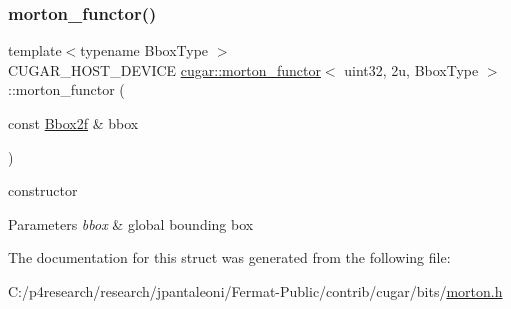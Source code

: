 \subsubsection{\texorpdfstring{morton\+\_\+functor()}{morton\_functor()}}
{\footnotesize\ttfamily template$<$typename Bbox\+Type $>$ \\
C\+U\+G\+A\+R\+\_\+\+H\+O\+S\+T\+\_\+\+D\+E\+V\+I\+CE \hyperlink{structcugar_1_1morton__functor}{cugar\+::morton\+\_\+functor}$<$ uint32, 2u, Bbox\+Type $>$\+::morton\+\_\+functor (\begin{DoxyParamCaption}\item[{const \hyperlink{structcugar_1_1_bbox}{Bbox2f} \&}]{bbox }\end{DoxyParamCaption})\hspace{0.3cm}{\ttfamily [inline]}}

constructor


\begin{DoxyParams}{Parameters}
{\em bbox} & global bounding box \\
\hline
\end{DoxyParams}


The documentation for this struct was generated from the following file\+:\begin{DoxyCompactItemize}
\item 
C\+:/p4research/research/jpantaleoni/\+Fermat-\/\+Public/contrib/cugar/bits/\hyperlink{morton_8h}{morton.\+h}\end{DoxyCompactItemize}
